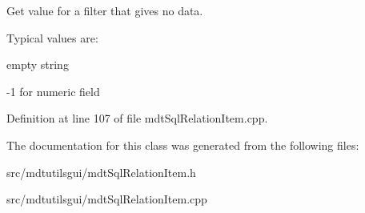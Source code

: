 Get value for a filter that gives no data. 

Typical values are:
\begin{DoxyItemize}
\item empty string
\item -\/1 for numeric field 
\end{DoxyItemize}

Definition at line 107 of file mdtSqlRelationItem.cpp.



The documentation for this class was generated from the following files:\begin{DoxyCompactItemize}
\item 
src/mdtutilsgui/mdtSqlRelationItem.h\item 
src/mdtutilsgui/mdtSqlRelationItem.cpp\end{DoxyCompactItemize}
